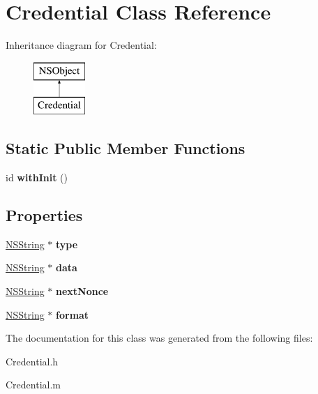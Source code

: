 \hypertarget{interface_credential}{
\section{\-Credential \-Class \-Reference}
\label{interface_credential}
}
\-Inheritance diagram for \-Credential\-:\begin{figure}[H]
\begin{center}
\leavevmode
\includegraphics[height=2.000000cm]{interface_credential}
\end{center}
\end{figure}
\subsection*{\-Static \-Public \-Member \-Functions}
\begin{DoxyCompactItemize}
\item 
\hypertarget{interface_credential_a79510e67087c0cfb041d871d0a32ca4f}{
id {\bfseries with\-Init} ()}
\label{interface_credential_a79510e67087c0cfb041d871d0a32ca4f}

\end{DoxyCompactItemize}
\subsection*{\-Properties}
\begin{DoxyCompactItemize}
\item 
\hypertarget{interface_credential_a546016ff2be0b8dc44e4ee82c52b5402}{
\hyperlink{class_n_s_string}{\-N\-S\-String} $\ast$ {\bfseries type}}
\label{interface_credential_a546016ff2be0b8dc44e4ee82c52b5402}

\item 
\hypertarget{interface_credential_ac50e1dfa9c8939fd34b9492ddde18255}{
\hyperlink{class_n_s_string}{\-N\-S\-String} $\ast$ {\bfseries data}}
\label{interface_credential_ac50e1dfa9c8939fd34b9492ddde18255}

\item 
\hypertarget{interface_credential_a8a81638fcab7c1d2a61dba4d1f8fdbb8}{
\hyperlink{class_n_s_string}{\-N\-S\-String} $\ast$ {\bfseries next\-Nonce}}
\label{interface_credential_a8a81638fcab7c1d2a61dba4d1f8fdbb8}

\item 
\hypertarget{interface_credential_a5fa39aa62f0e03e78cf094a32c3afac9}{
\hyperlink{class_n_s_string}{\-N\-S\-String} $\ast$ {\bfseries format}}
\label{interface_credential_a5fa39aa62f0e03e78cf094a32c3afac9}

\end{DoxyCompactItemize}


\-The documentation for this class was generated from the following files\-:\begin{DoxyCompactItemize}
\item 
\-Credential.\-h\item 
\-Credential.\-m\end{DoxyCompactItemize}
